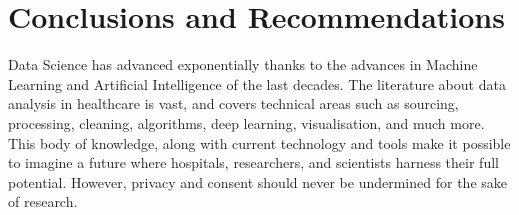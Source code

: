 \documentclass[a4paper,12pt]{article}
\begin{document}


\section{Conclusions and Recommendations}

Data Science has advanced exponentially thanks to the advances in Machine
Learning and Artificial Intelligence of the last decades.
The literature about data analysis in healthcare is vast, and covers technical
areas such as sourcing, processing, cleaning, algorithms, deep learning,
visualisation, and much more.
This body of knowledge, along with current technology and tools make it
possible to imagine a future where hospitals, researchers, and scientists
harness their full potential.
However, privacy and consent should never be undermined for the sake of research.

\pagebreak
\printbibliography
\end{document}

